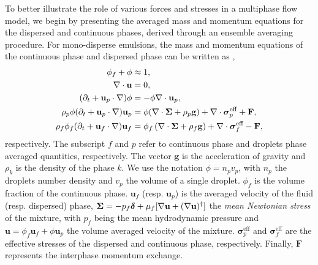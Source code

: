 To better illustrate the role of various forces and stresses in a multiphase flow model, we begin by presenting the averaged mass and momentum equations for the dispersed and continuous phases, derived through an ensemble averaging procedure.
For mono-disperse emulsions, the mass and momentum equations of the continuous phase and dispersed phase can be written as \citep{fintzi2025averaged},
\begin{align}
    \label{eq:dt_phif}
    \phi_f + \phi &\approx 1,\\
    \div \textbf{u} &= 0 
    \label{eq:div_u},\\
    \label{eq:dt_phip}
    (\pddt + \textbf{u}_p \cdot \grad)\phi
    &=
    - \phi \div \textbf{u}_p,\\
    \label{eq:dt_up}
    \rho_p \phi  (\pddt + \textbf{u}_p \cdot \grad)\textbf{u}_p
    &=
     \phi (\div \bm\Sigma
    + \rho_p  \textbf{g})
    + \div \bm\sigma_p^\text{eff}
    + \textbf{F}
    ,\\
    \rho_f \phi_f (\pddt + \textbf{u}_f  \cdot \grad) \textbf{u}_f
    &= \phi_f  \left(\div \bm{\Sigma}
    + \rho_f \textbf{g}\right)
    + \div \bm\sigma_f^{\text{eff}}
    - \textbf{F},
    \label{eq:dt_uf2}
\end{align}
respectively. 
The subscript $f$ and $p$ refer to continuous phase and droplets phase averaged quantities, respectively.
The vector $\textbf{g}$ is the acceleration of gravity and $\rho_k$ is the density of the phase $k$. 
We use the notation $\phi = n_p v_p$, with $n_p$ the droplets number density and $v_p$ the volume of a single droplet.
$\phi_f$ is the volume fraction of the continuous phase.
$\textbf{u}_f$ (resp. $\textbf{u}_p$) is the averaged velocity of the fluid (resp. dispersed) phase, $\bm\Sigma = - p_f \bm\delta + \mu_f [\mathbf{\nabla} \textbf{u} +  (\mathbf{\nabla} \textbf{u})^\dagger ]$ the \textit{mean Newtonian stress} of the mixture, with $p_f$ being the mean hydrodynamic pressure and $\textbf{u}=\phi_f \textbf{u}_f + \phi \textbf{u}_p$ the volume averaged velocity of the mixture.
$\bm{\sigma}^{\text{eff}}_p$ and $\bm{\sigma}^{\text{eff}}_f$ are the effective stresses of the dispersed and continuous phase, respectively.  
Finally, $\textbf{F}$ represents the interphase momentum exchange. 

